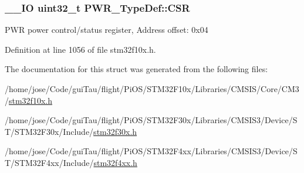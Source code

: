 \hypertarget{struct_p_w_r___type_def_ae17097e69c88b6c00033d6fb84a8182b}{
\subsubsection[{C\-S\-R}]{\setlength{\rightskip}{0pt plus 5cm}\-\_\-\-\_\-\-I\-O {\bf uint32\-\_\-t} P\-W\-R\-\_\-\-Type\-Def\-::\-C\-S\-R}}\label{struct_p_w_r___type_def_ae17097e69c88b6c00033d6fb84a8182b}
P\-W\-R power control/status register, Address offset\-: 0x04 

Definition at line 1056 of file stm32f10x.\-h.



The documentation for this struct was generated from the following files\-:\begin{DoxyCompactItemize}
\item 
/home/jose/\-Code/gui\-Tau/flight/\-Pi\-O\-S/\-S\-T\-M32\-F10x/\-Libraries/\-C\-M\-S\-I\-S/\-Core/\-C\-M3/\hyperlink{stm32f10x_8h}{stm32f10x.\-h}\item 
/home/jose/\-Code/gui\-Tau/flight/\-Pi\-O\-S/\-S\-T\-M32\-F30x/\-Libraries/\-C\-M\-S\-I\-S3/\-Device/\-S\-T/\-S\-T\-M32\-F30x/\-Include/\hyperlink{stm32f30x_8h}{stm32f30x.\-h}\item 
/home/jose/\-Code/gui\-Tau/flight/\-Pi\-O\-S/\-S\-T\-M32\-F4xx/\-Libraries/\-C\-M\-S\-I\-S3/\-Device/\-S\-T/\-S\-T\-M32\-F4xx/\-Include/\hyperlink{stm32f4xx_8h}{stm32f4xx.\-h}\end{DoxyCompactItemize}

